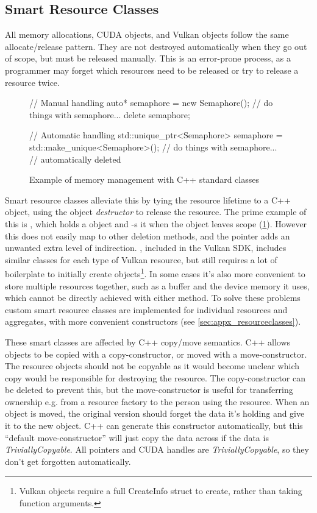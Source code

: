\subsection{Smart Resource Classes}
All memory allocations, CUDA objects, and Vulkan objects follow the same allocate/release pattern.
They are not destroyed automatically when they go out of scope, but must be released manually.
This is an error-prone process, as a programmer may forget which resources need to be released or try to release a resource twice.

\begin{figure}
    \centering
    \begin{cppcode}
// Manual handling
{
    auto* semaphore = new Semaphore();
    // do things with semaphore...
    delete semaphore;
}

// Automatic handling
{
    std::unique_ptr<Semaphore> semaphore = std::make_unique<Semaphore>();
    // do things with semaphore...
    // automatically deleted
}
    \end{cppcode}
    \caption{Example of memory management with C++ standard classes}
    \label{fig:ImplUniquePtr}
\end{figure}

Smart resource classes alleviate this by tying the resource lifetime to a C++ object, using the object \emph{destructor} to release the resource.
The prime example of this is , which holds a  object and -s it when the object leaves scope (\cref{fig:ImplUniquePtr}).
However this does not easily map to other deletion methods, and the pointer adds an unwanted extra level of indirection.
, included in the Vulkan SDK, includes similar classes for each type of Vulkan resource, but still requires a lot of boilerplate to initially create objects\footnote{Vulkan objects require a full CreateInfo struct to create, rather than taking function arguments.}.
In some cases it's also more convenient to store multiple resources together, such as a buffer and the device memory it uses, which cannot be directly achieved with either method.
To solve these problems custom smart resource classes are implemented for individual resources and aggregates, with more convenient constructors (see \cref{sec:appx_resourceclasses}).

These smart classes are affected by C++ copy/move semantics.
C++ allows objects to be copied with a copy-constructor, or moved with a move-constructor.
The resource objects should not be copyable as it would become unclear which copy would be responsible for destroying the resource.
The copy-constructor can be deleted to prevent this, but the move-constructor is useful for transferring ownership e.g. from a resource factory to the person using the resource.
When an object is moved, the original version should forget the data it's holding and give it to the new object.
C++ can generate this constructor automatically, but this ``default move-constructor'' will just copy the data across if the data is \textit{TriviallyCopyable}\cite{cpprefMoveConstructor}.%
All pointers and CUDA handles are \textit{TriviallyCopyable}, so they don't get forgotten automatically.

